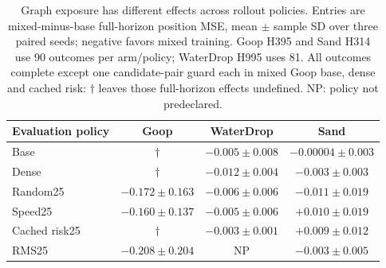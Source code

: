 \begin{table}[t]
\centering\scriptsize
\caption{Graph exposure has different effects across rollout policies. Entries are mixed-minus-base full-horizon position MSE, mean $\pm$ sample SD over three paired seeds; negative favors mixed training. Goop H395 and Sand H314 use 90 outcomes per arm/policy; WaterDrop H995 uses 81. All outcomes complete except one candidate-pair guard each in mixed Goop base, dense and cached risk: $\dagger$ leaves those full-horizon effects undefined. NP: policy not predeclared.}
\label{tab:goop-rollouts}
\setlength{\tabcolsep}{3pt}
\renewcommand{\arraystretch}{1.2}
\begin{tabular}{lccc}
\toprule
Evaluation policy & Goop & WaterDrop & Sand\\
\midrule
Base & $\dagger$ & $-0.005\pm0.008$ & $-0.00004\pm0.003$\\
Dense & $\dagger$ & $-0.012\pm0.004$ & $-0.003\pm0.003$\\
Random25 & $-0.172\pm0.163$ & $-0.006\pm0.006$ & $-0.011\pm0.019$\\
Speed25 & $-0.160\pm0.137$ & $-0.005\pm0.006$ & $+0.010\pm0.019$\\
Cached risk25 & $\dagger$ & $-0.003\pm0.001$ & $+0.009\pm0.012$\\
RMS25 & $-0.208\pm0.204$ & NP & $-0.003\pm0.005$\\
\bottomrule
\end{tabular}
\end{table}

